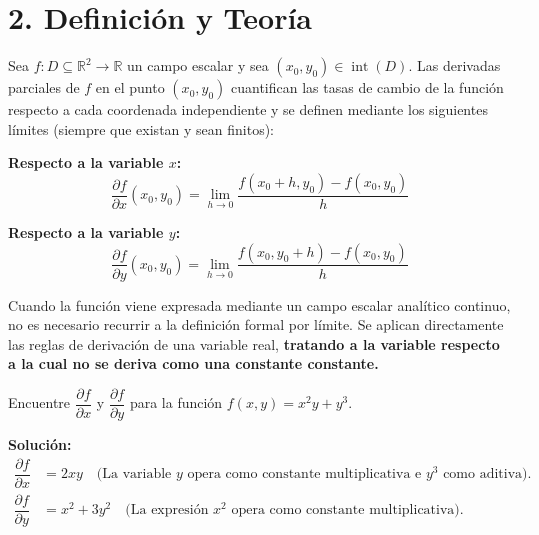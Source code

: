 \documentclass[11pt]{article}
\newenvironment{teoria}{%
  \section*{2. Definición y Teoría}%
}{}
\newenvironment{definicion}[1]{%
  \begin{tcolorbox}[colback=blue!5,colframe=blue!75!black,title=Definición: #1]%
}{%
  \end{tcolorbox}%
}
\newenvironment{procesamiento}[1]{%
  \begin{tcolorbox}[colback=gray!5,colframe=gray!60!black,title=Procedimiento: #1]%
}{%
  \end{tcolorbox}%
}
\newenvironment{ejemplo}[1]{%
  \begin{tcolorbox}[colback=white,colframe=gray!40,title=Ejemplo: #1]%
}{%
  \end{tcolorbox}%
}
\begin{document}
\begin{teoria}
  
  \begin{definicion}{Derivadas Parciales por Límite}
    Sea $f \colon D \subseteq \mathbb{R}^2 \to \mathbb{R}$ un campo escalar y sea $(x_0, y_0) \in \operatorname{int}(D)$. Las derivadas parciales de $f$ en el punto $(x_0, y_0)$ cuantifican las tasas de cambio de la función respecto a cada coordenada independiente y se definen mediante los siguientes límites (siempre que existan y sean finitos):

    \textbf{Respecto a la variable $x$:}
    $$ \displaystyle \dfrac{\partial f}{\partial x}(x_0, y_0) = \displaystyle \lim\limits_{h \to 0} \displaystyle \dfrac{f(x_0 + h, y_0) - f(x_0, y_0)}{h} $$

    \textbf{Respecto a la variable $y$:}
    $$ \displaystyle \dfrac{\partial f}{\partial y}(x_0, y_0) = \displaystyle \lim\limits_{h \to 0} \displaystyle \dfrac{f(x_0, y_0 + h) - f(x_0, y_0)}{h} $$
  \end{definicion}

  \begin{procesamiento}{Uso Práctico: Reglas de Álgebra de Derivadas}
    Cuando la función viene expresada mediante un campo escalar analítico continuo, no es necesario recurrir a la definición formal por límite. Se aplican directamente las reglas de derivación de una variable real, \textbf{tratando a la variable respecto a la cual no se deriva como una constante constante.}
  \end{procesamiento}

  \begin{ejemplo}{Cálculo Algebraico Directo}
    Encuentre $\displaystyle \dfrac{\partial f}{\partial x}$ y $\displaystyle \dfrac{\partial f}{\partial y}$ para la función $f(x,y) = x^2 y + y^3$.
    
    \textbf{Solución:}
    \begin{align*}
      \displaystyle \dfrac{\partial f}{\partial x} &= 2xy \quad \text{(La variable } y \text{ opera como constante multiplicativa e } y^3 \text{ como aditiva).} \\
      \displaystyle \dfrac{\partial f}{\partial y} &= x^2 + 3y^2 \quad \text{(La expresión } x^2 \text{ opera como constante multiplicativa).}
    \end{align*}
  \end{ejemplo}


\end{teoria}
\end{document}
